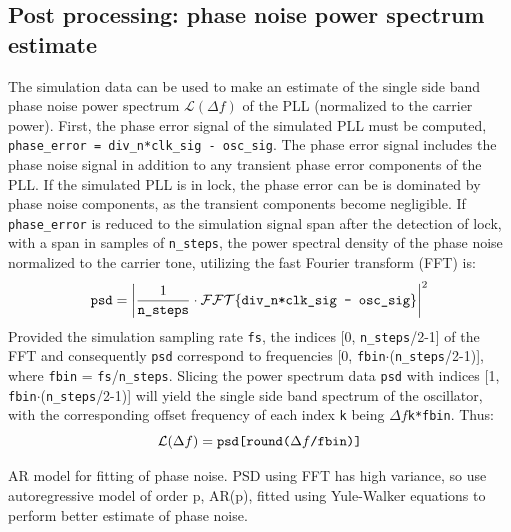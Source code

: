 \subsection{Post processing: phase noise power spectrum estimate}
The simulation data can be used to make an estimate of the single side band phase noise power spectrum $\mathcal{L}(\Delta f)$ of the PLL (normalized to the carrier power). First, the phase error signal of the simulated PLL must be computed, \texttt{phase\_error = div\_n*clk\_sig - osc\_sig}. The phase error signal includes the phase noise signal in addition to any transient phase error components of the PLL. If the simulated PLL is in lock, the phase error can be is dominated by phase noise components, as the transient components become negligible. If \texttt{phase\_error} is reduced to the simulation signal span after the detection of lock, with a span in samples of \texttt{n\_steps}, the power spectral density of the phase noise normalized to the carrier tone, utilizing the fast Fourier transform (FFT) is:
\begin{equation}
	\text{\texttt{psd}} = \left|\frac{1}{\text{\texttt{n\_steps}}}\cdot\mathcal{FFT}\{\text{\texttt{div\_n*clk\_sig - osc\_sig}}\}\right|^2
\end{equation}
Provided the simulation sampling rate \texttt{fs}, the indices [0, \texttt{n\_steps}/2-1] of the FFT and consequently \texttt{psd} correspond to frequencies [0, \texttt{fbin}$\cdot$(\texttt{n\_steps}/2-1)], where \texttt{fbin} = \texttt{fs}/\texttt{n\_steps}. Slicing the power spectrum data \texttt{psd} with indices [1, \texttt{fbin}$\cdot$(\texttt{n\_steps}/2-1)] will yield the single side band spectrum of the oscillator, with the corresponding offset frequency of each index \texttt{k} being $\Delta f$\texttt{k*fbin}. Thus:
\begin{equation}
	\mathcal{L}(\Delta f) = \text{\texttt{psd[round(}}\Delta f\text{\texttt{/fbin)]}}
\end{equation}

AR model for fitting of phase noise. PSD using FFT has high variance, so use autoregressive model of order p, AR(p), fitted using Yule-Walker equations to perform better estimate of phase noise.  

